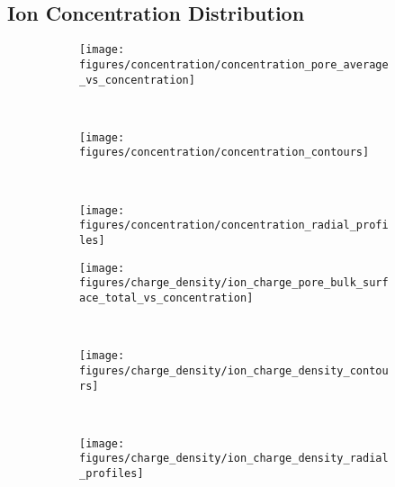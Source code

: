 \documentclass[journal=ancac3,manuscript=article,etalmode=truncate,maxauthors=0,layout=onecolumn]{achemso}
\begin{document}
\subsection{Ion Concentration Distribution}\label{sec:ionc}
%

\begin{figure}[!htb]
  \centering
  \begin{minipage}[t]{8cm}
    \begin{subfigure}[t]{8cm}
      \centering
      \caption{}\vspace{-3mm}\label{fig:concentration_pore_average_vs_cbulk}
      \texttt{[image: figures/concentration/concentration\_pore\_average\_vs\_concentration]}
    \end{subfigure}
    \\
    \begin{subfigure}[t]{8cm}
      \centering
      \caption{}\vspace{-3mm}\label{fig:concentration_contours}
      \texttt{[image: figures/concentration/concentration\_contours]}
    \end{subfigure}
    \\
    \begin{subfigure}[t]{8cm}
      \centering
      \caption{}\vspace{-3mm}\label{fig:concentration_radial_profiles}
      \texttt{[image: figures/concentration/concentration\_radial\_profiles]}
    \end{subfigure}
  \end{minipage}
  \begin{minipage}[t]{8cm}
    \begin{subfigure}[t]{8cm}
      \centering
      \caption{}\vspace{-3mm}\label{fig:ion_charge_dist_vs_cbulk}
      \texttt{[image: figures/charge\_density/ion\_charge\_pore\_bulk\_surface\_total\_vs\_concentration]}
    \end{subfigure}
    \\
    \begin{subfigure}[t]{8cm}
      \centering
      \caption{}\vspace{-3mm}\label{fig:ion_scd_contours}
      \texttt{[image: figures/charge\_density/ion\_charge\_density\_contours]}
    \end{subfigure}
    \\
    \begin{subfigure}[t]{8cm}
      \centering
      \caption{}\vspace{-3mm}\label{fig:ion_scd_radial_profiles}
      \texttt{[image: figures/charge\_density/ion\_charge\_density\_radial\_profiles]}
    \end{subfigure}
  \end{minipage}


\end{figure}
\end{document}
